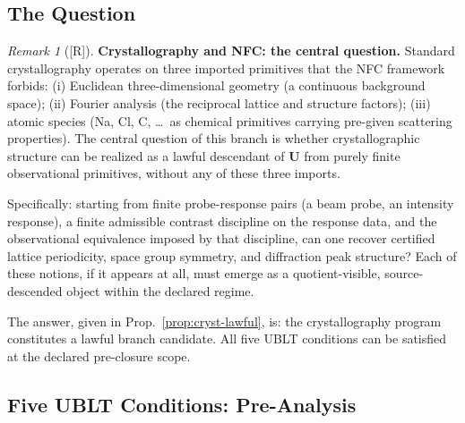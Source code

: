 \documentclass[12pt,oneside]{amsbook}
\theoremstyle{plain}
\theoremstyle{definition}
\theoremstyle{remark}
\newtheorem{remark}[theorem]{Remark}
\newcommand{\status}[1]{\textup{[#1]}}
\begin{document}
\subsection{The Question}

\begin{remark}[\status{R}]\label{rem:cryst-question}
\textbf{Crystallography and NFC: the central question.}
Standard crystallography operates on three imported primitives that
the NFC framework forbids: (i) Euclidean three-dimensional geometry
(a continuous background space); (ii) Fourier analysis (the
reciprocal lattice and structure factors); (iii) atomic species (Na,
Cl, C, \ldots\ as chemical primitives carrying pre-given scattering
properties).  The central question of this branch is whether
crystallographic structure can be realized as a lawful descendant of
$\mathbf{U}$ from purely finite observational primitives, without any
of these three imports.

Specifically: starting from finite probe-response pairs (a beam
probe, an intensity response), a finite admissible contrast discipline
on the response data, and the observational equivalence imposed by
that discipline, can one recover certified lattice periodicity, space
group symmetry, and diffraction peak structure?  Each of these
notions, if it appears at all, must emerge as a quotient-visible,
source-descended object within the declared regime.

The answer, given in Prop.~\ref{prop:cryst-lawful}, is: the
crystallography program constitutes a lawful branch candidate.  All
five UBLT conditions can be satisfied at the declared pre-closure
scope.
\end{remark}

\subsection{Five UBLT Conditions: Pre-Analysis}
\end{document}
